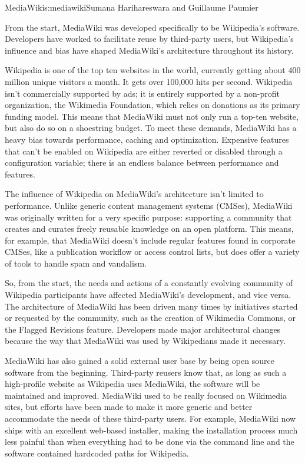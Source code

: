 \begin{aosachapter}{MediaWiki}{s:mediawiki}{Sumana Harihareswara and Guillaume Paumier}

From the start, MediaWiki was developed specifically to be Wikipedia's
software. Developers have worked to facilitate reuse by third-party
users, but Wikipedia's influence and bias have shaped MediaWiki's
architecture throughout its history.

Wikipedia is one of the top ten websites in the world, currently
getting about 400 million unique visitors a month. It gets over
100,000 hits per second. Wikipedia isn't commercially supported by
ads; it is entirely supported by a non-profit organization, the
Wikimedia Foundation, which relies on donations as its primary funding
model. This means that MediaWiki must not only run a top-ten website,
but also do so on a shoestring budget. To meet these demands,
MediaWiki has a heavy bias towards performance, caching and
optimization. Expensive features that can't be enabled on Wikipedia
are either reverted or disabled through a configuration variable;
there is an endless balance between performance and features.

The influence of Wikipedia on MediaWiki's architecture isn't limited
to performance. Unlike generic content management systems (CMSes),
MediaWiki was originally written for a very specific purpose:
supporting a community that creates and curates freely reusable
knowledge on an open platform. This means, for example, that MediaWiki
doesn't include regular features found in corporate CMSes, like a
publication workflow or access control lists, but does offer a variety
of tools to handle spam and vandalism.

So, from the start, the needs and actions of a constantly evolving
community of Wikipedia participants have affected MediaWiki's
development, and vice versa. The architecture of MediaWiki has been
driven many times by initiatives started or requested by the
community, such as the creation of Wikimedia Commons, or the Flagged
Revisions feature. Developers made major architectural changes because
the way that MediaWiki was used by Wikipedians made it necessary.

MediaWiki has also gained a solid external user base by being
open source software from the beginning. Third-party reusers know
that, as long as such a high-profile website as Wikipedia uses
MediaWiki, the software will be maintained and improved. MediaWiki
used to be really focused on Wikimedia sites, but efforts have been
made to make it more generic and better accommodate the needs of these
third-party users. For example, MediaWiki now ships with an excellent
web-based installer, making the installation process much less painful
than when everything had to be done via the command line and the
software contained hardcoded paths for Wikipedia.


\end{aosachapter}
